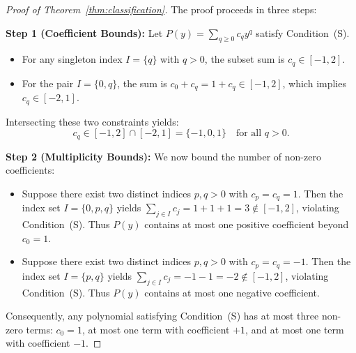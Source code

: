 \documentclass[11pt,reqno]{amsart}
\theoremstyle{plain}
\theoremstyle{definition}
\theoremstyle{remark}
\begin{document}
\begin{proof}[Proof of Theorem~\ref{thm:classification}]
The proof proceeds in three steps:

\textbf{Step 1 (Coefficient Bounds):}
Let $P(y) = \sum_{q \ge 0} c_q y^q$ satisfy Condition~(S).
\begin{itemize}
    \item For any singleton index $I = \{q\}$ with $q > 0$, the subset sum is $c_q \in [-1, 2]$.
    \item For the pair $I = \{0, q\}$, the sum is $c_0 + c_q = 1 + c_q \in [-1, 2]$, which implies $c_q \in [-2, 1]$.
\end{itemize}
Intersecting these two constraints yields:
\begin{equation}
c_q \in [-1, 2] \cap [-2, 1] = \{-1, 0, 1\} \quad \text{for all } q > 0.
\end{equation}

\textbf{Step 2 (Multiplicity Bounds):}
We now bound the number of non-zero coefficients:
\begin{itemize}
    \item Suppose there exist two distinct indices $p, q > 0$ with $c_p = c_q = 1$. Then the index set $I = \{0, p, q\}$ yields $\sum_{j \in I} c_j = 1 + 1 + 1 = 3 \notin [-1, 2]$, violating Condition~(S). Thus $P(y)$ contains at most one positive coefficient beyond $c_0 = 1$.
    \item Suppose there exist two distinct indices $p, q > 0$ with $c_p = c_q = -1$. Then the index set $I = \{p, q\}$ yields $\sum_{j \in I} c_j = -1 - 1 = -2 \notin [-1, 2]$, violating Condition~(S). Thus $P(y)$ contains at most one negative coefficient.
\end{itemize}
Consequently, any polynomial satisfying Condition~(S) has at most three non-zero terms: $c_0 = 1$, at most one term with coefficient $+1$, and at most one term with coefficient $-1$.


\end{proof}
\end{document}
